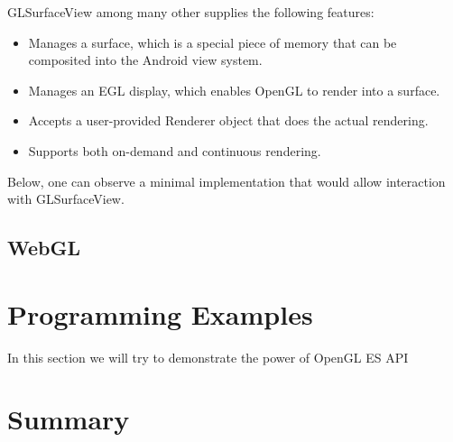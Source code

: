 \documentclass[a4paper,11pt]{article}
\begin{document}
GLSurfaceView among many other supplies the following features:
\begin{itemize}
\item Manages a surface, which is a special piece of memory that can be composited into the Android view system.
\item Manages an EGL display, which enables OpenGL to render into a surface.
\item Accepts a user-provided Renderer object that does the actual rendering.
\item Supports both on-demand and continuous rendering.
\end{itemize}

Below, one can observe a minimal implementation that would allow interaction with GLSurfaceView.



\pagebreak[3] 
\subsection{WebGL}


\clearpage 
\section{Programming Examples} 

In this section we will try to demonstrate the power of OpenGL ES API 




\section{Summary} 


\clearpage
\label{Bibliography} 
%

\footnotesize{  }
\end{document}
